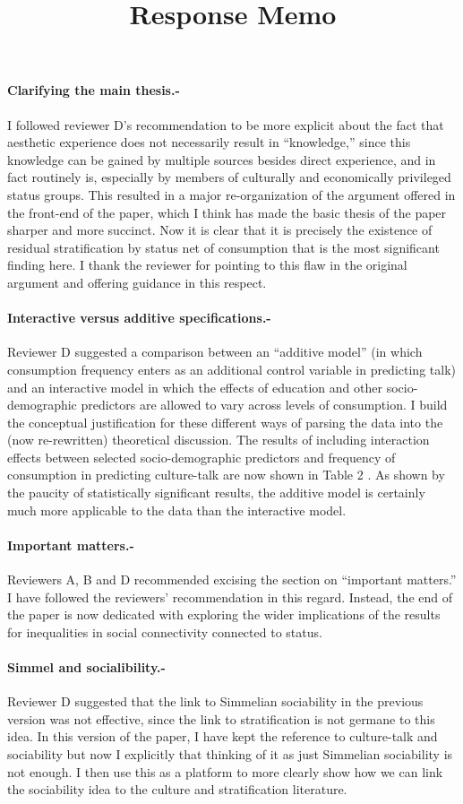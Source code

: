 \documentclass[12pt]{article}
\title{Response Memo}
\begin{document}
\maketitle
 	 \paragraph{Clarifying the main thesis.-} I followed reviewer D's recommendation to be more explicit about the fact that aesthetic experience does not necessarily result in ``knowledge,'' since this knowledge can be gained by multiple sources besides direct experience, and in fact routinely is, especially by members of culturally and economically privileged status groups.  This resulted in a major re-organization of the argument offered in the front-end of the paper, which I think has made the basic thesis of the paper sharper and more succinct.  Now it is clear that it is precisely the existence of residual stratification by status net of consumption that is the most significant finding here. I thank the reviewer for pointing to this flaw in the original argument and offering guidance in this respect. 
      \paragraph{Interactive versus additive specifications.-}Reviewer D suggested a comparison between an ``additive model'' (in which consumption frequency enters as an additional control variable in predicting talk) and an interactive model in which the effects of education and other socio-demographic predictors are allowed to vary across levels of consumption.  I build the conceptual justification for these different ways of parsing the data into the (now re-rewritten) theoretical discussion. The results of including interaction effects between selected socio-demographic predictors and frequency of consumption in predicting culture-talk are now shown in Table 2 .  As shown by the paucity of statistically significant results, the additive model is certainly much more applicable to the data than the interactive model.
      \paragraph{Important matters.-} Reviewers A, B and D recommended excising the section on ``important matters.''  I have followed the reviewers' recommendation in this regard. Instead, the end of the paper is now dedicated with exploring the wider implications of the results for inequalities in social connectivity connected to status.
      \paragraph{Simmel and socialibility.-} Reviewer D suggested that the link to Simmelian sociability in the previous version was not effective, since the link to stratification is not germane to this idea. In this version of the paper, I have kept the reference to culture-talk and sociability but now I explicitly that thinking of it as just Simmelian sociability is not enough.  I then use this as a platform to more clearly show how we can link the sociability idea to the culture and stratification literature.
\end{document}
